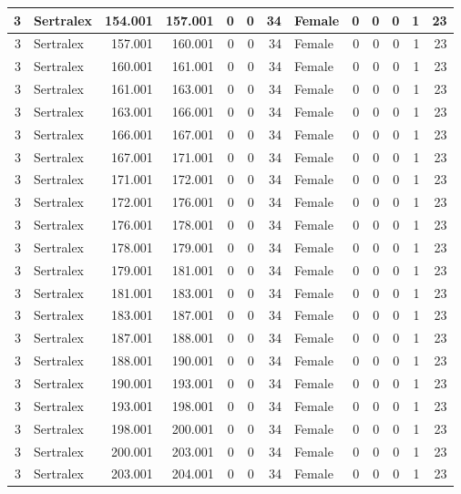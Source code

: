 \documentclass[
]{book}
\begin{document}
\begin{table}
\begin{tabular}[t]{r|l|r|r|r|r|r|l|r|r|r|r|r}
\hline
3 & Sertralex & 154.001 & 157.001 & 0 & 0 & 34 & Female & 0 & 0 & 0 & 1 & 23\\
\hline
3 & Sertralex & 157.001 & 160.001 & 0 & 0 & 34 & Female & 0 & 0 & 0 & 1 & 23\\
\hline
3 & Sertralex & 160.001 & 161.001 & 0 & 0 & 34 & Female & 0 & 0 & 0 & 1 & 23\\
\hline
3 & Sertralex & 161.001 & 163.001 & 0 & 0 & 34 & Female & 0 & 0 & 0 & 1 & 23\\
\hline
3 & Sertralex & 163.001 & 166.001 & 0 & 0 & 34 & Female & 0 & 0 & 0 & 1 & 23\\
\hline
3 & Sertralex & 166.001 & 167.001 & 0 & 0 & 34 & Female & 0 & 0 & 0 & 1 & 23\\
\hline
3 & Sertralex & 167.001 & 171.001 & 0 & 0 & 34 & Female & 0 & 0 & 0 & 1 & 23\\
\hline
3 & Sertralex & 171.001 & 172.001 & 0 & 0 & 34 & Female & 0 & 0 & 0 & 1 & 23\\
\hline
3 & Sertralex & 172.001 & 176.001 & 0 & 0 & 34 & Female & 0 & 0 & 0 & 1 & 23\\
\hline
3 & Sertralex & 176.001 & 178.001 & 0 & 0 & 34 & Female & 0 & 0 & 0 & 1 & 23\\
\hline
3 & Sertralex & 178.001 & 179.001 & 0 & 0 & 34 & Female & 0 & 0 & 0 & 1 & 23\\
\hline
3 & Sertralex & 179.001 & 181.001 & 0 & 0 & 34 & Female & 0 & 0 & 0 & 1 & 23\\
\hline
3 & Sertralex & 181.001 & 183.001 & 0 & 0 & 34 & Female & 0 & 0 & 0 & 1 & 23\\
\hline
3 & Sertralex & 183.001 & 187.001 & 0 & 0 & 34 & Female & 0 & 0 & 0 & 1 & 23\\
\hline
3 & Sertralex & 187.001 & 188.001 & 0 & 0 & 34 & Female & 0 & 0 & 0 & 1 & 23\\
\hline
3 & Sertralex & 188.001 & 190.001 & 0 & 0 & 34 & Female & 0 & 0 & 0 & 1 & 23\\
\hline
3 & Sertralex & 190.001 & 193.001 & 0 & 0 & 34 & Female & 0 & 0 & 0 & 1 & 23\\
\hline
3 & Sertralex & 193.001 & 198.001 & 0 & 0 & 34 & Female & 0 & 0 & 0 & 1 & 23\\
\hline
3 & Sertralex & 198.001 & 200.001 & 0 & 0 & 34 & Female & 0 & 0 & 0 & 1 & 23\\
\hline
3 & Sertralex & 200.001 & 203.001 & 0 & 0 & 34 & Female & 0 & 0 & 0 & 1 & 23\\
\hline
3 & Sertralex & 203.001 & 204.001 & 0 & 0 & 34 & Female & 0 & 0 & 0 & 1 & 23\\

\end{tabular}
\end{table}
\end{document}
